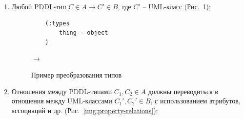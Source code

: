 \documentclass[a4paper,14pt]{extreport}
\begin{document}
    \begin{enumerate}
        \item Любой PDDL-тип $C \in A \rightarrow C' \in B$, где $C'$ -- UML-класс (Рис.~\ref{img:property-types});

\begin{figure}[H]
    \hfill
    \begin{minipage}[h]{0.40\linewidth}
        {\raggedright
        \begin{verbatim}
    (:types
        thing - object
    )
        \end{verbatim} 
        }
    \end{minipage}
    \hfill
    $\rightarrow$
    \hfill
    \begin{minipage}[h]{0.45\linewidth}
    \end{minipage}
    \caption{Пример преобразования типов}
    \label{img:property-types}
\end{figure}

        \item Отношения между PDDL-типами $C_1, C_2 \in A$ должны переводиться в отношения между UML-классами $C_1', C_2' \in B$, с использованием атрибутов, ассоциаций и др. (Рис.~\ref{img:property-relations}); 
        

\end{enumerate}
\end{document}
